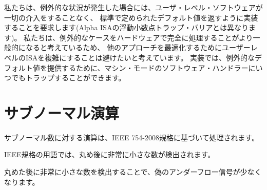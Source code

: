 \begin{commentary}
\begin{comment}
We require implementations to return the standard-mandated default
values in the case of exceptional conditions, without any further
intervention on the part of user-level software (unlike the Alpha ISA
floating-point trap barriers).  We believe full hardware handling of
exceptional cases will become more common, and so wish to avoid
complicating the user-level ISA to optimize other approaches.
Implementations can always trap to machine-mode software handlers to
provide exceptional default values.
\end{comment}

私たちは、例外的な状況が発生した場合には、ユーザ・レベル・ソフトウェアが一切の介入をすることなく、
標準で定められたデフォルト値を返すように実装することを要求します(Alpha ISAの浮動小数点トラップ・バリアとは異なります)。
私たちは、例外的なケースをハードウェアで完全に処理することがより一般的になると考えているため、
他のアプローチを最適化するためにユーザーレベルのISAを複雑にすることは避けたいと考えています。
実装では、例外的なデフォルト値を提供するために、マシン・モードのソフトウェア・ハンドラーにいつでもトラップすることができます。
\end{commentary}

\begin{comment}
\section{Subnormal Arithmetic}
\end{comment}
\section{サブノーマル演算}

\begin{comment}
Operations on subnormal numbers are handled in accordance with the IEEE
754-2008 standard.
\end{comment}
サブノーマル数に対する演算は、IEEE 754-2008規格に基づいて処理されます。

\begin{comment}
In the parlance of the IEEE standard, tininess is detected after rounding.
\end{comment}
IEEE規格の用語では、丸め後に非常に小さな数が検出されます。

\begin{commentary}
\begin{comment}
Detecting tininess after rounding results in fewer spurious underflow signals.
\end{comment}
丸めた後に非常に小さな数を検出することで、偽のアンダーフロー信号が少なくなります。
\end{commentary}

